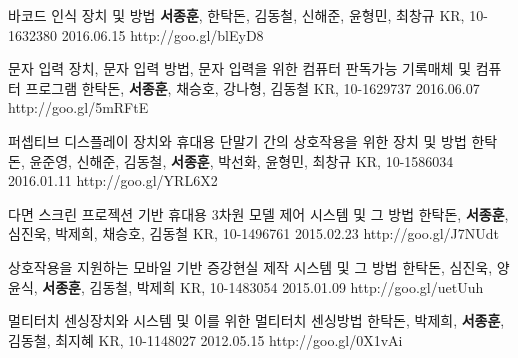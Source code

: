 
\begin{cventries}
  \cvpatententry
    {바코드 인식 장치 및 방법} %
    {\textbf{서종훈}, 한탁돈, 김동철, 신해준, 윤형민, 최창규} %
    {KR, 10-1632380} %
    {2016.06.15} %
    {http://goo.gl/blEyD8}

  \cvpatententry
    {문자 입력 장치, 문자 입력 방법, 문자 입력을 위한 컴퓨터 판독가능 기록매체 및 컴퓨터 프로그램} %
    {한탁돈, \textbf{서종훈}, 채승호, 강나형, 김동철} %
    {KR, 10-1629737} %
    {2016.06.07} %
    {http://goo.gl/5mRFtE}

  \cvpatententry
    {퍼셉티브 디스플레이 장치와 휴대용 단말기 간의 상호작용을 위한 장치 및 방법} %
    {한탁돈, 윤준영, 신해준, 김동철, \textbf{서종훈}, 박선화, 윤형민, 최창규} %
    {KR, 10-1586034} %
    {2016.01.11} %
    {http://goo.gl/YRL6X2}

  \cvpatententry
    {다면 스크린 프로젝션 기반 휴대용 3차원 모델 제어 시스템 및 그 방법} %
    {한탁돈, \textbf{서종훈}, 심진욱, 박제희, 채승호, 김동철} %
    {KR, 10-1496761} %
    {2015.02.23} %
    {http://goo.gl/J7NUdt}

  \cvpatententry
    {상호작용을 지원하는 모바일 기반 증강현실 제작 시스템 및 그 방법} %
    {한탁돈, 심진욱, 양윤식, \textbf{서종훈}, 김동철, 박제희} %
    {KR, 10-1483054} %
    {2015.01.09} %
    {http://goo.gl/uetUuh}

  \cvpatententry
    {멀티터치 센싱장치와 시스템 및 이를 위한 멀티터치 센싱방법} %
    {한탁돈, 박제희, \textbf{서종훈}, 김동철, 최지혜} %
    {KR, 10-1148027} %
    {2012.05.15} %
    {http://goo.gl/0X1vAi}
\end{cventries}